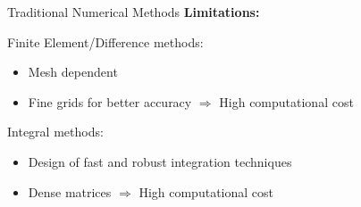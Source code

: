 \begin{frame}{Traditional Numerical Methods}
\textbf{Limitations:}
\vspace{0.3cm}

Finite Element/Difference methods:
\vspace{0.3cm}
\begin{itemize}
\item Mesh dependent
\vspace{0.3cm}
\item Fine grids for better accuracy $\Rightarrow$ High computational cost
\vspace{0.3cm}
\end{itemize}
\vspace{0.3cm}
Integral methods:
\vspace{0.3cm}
\begin{itemize}
\item Design of fast and robust integration techniques
\vspace{0.3cm}
\item Dense matrices $\Rightarrow$ High computational cost
\end{itemize}

\end{frame}



